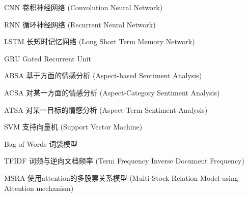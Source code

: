 \begin{denotation}[3cm]
\item[CNN] 卷积神经网络 (Convolution Neural Network)
\item[RNN] 循环神经网络 (Recurrent Neural Network) 
\item[LSTM] 长短时记忆网络 (Long Short Term Memory Network)
\item[GRU] Gated Recurrent Unit
\item[ABSA] 基于方面的情感分析 (Aspect-based Sentiment Analysis)
\item[ACSA] 对某一方面的情感分析 (Aspect-Category Sentiment Analysis)
\item[ATSA] 对某一目标的情感分析 (Aspect-Term Sentiment Analysis)
\item[SVM] 支持向量机 (Support Vector Machine)
\item[Bag of Words] 词袋模型
\item[TFIDF] 词频与逆向文档频率 (Term Frequency Inverse Document Frequency)
\item[MSRA] 使用attention的多股票关系模型 (Multi-Stock Relation Model using Attention mechanism) 
\end{denotation}
